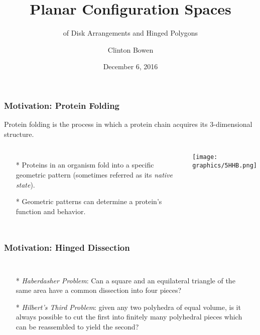 \documentclass{beamer}
\title[Planar Configuration Spaces]{Planar Configuration Spaces }
\subtitle{of Disk Arrangements and Hinged Polygons}
\author{Clinton Bowen}
\institute
{
  Cal State Northridge
}
\date
{December 6, 2016}
\begin{document}
\frame{\titlepage}
\begin{frame}
  \frametitle{Motivation: Protein Folding}
  Protein folding is the process in which a protein chain acquires its 3-dimensional structure.
  \begin{columns}[c] 
   \begin{itemize}
    \item[*] Proteins in an organism fold into a specific geometric pattern (sometimes referred as its \textit{native state}).
    \item[*]  Geometric patterns can determine a protein's function and behavior.
   \end{itemize}
     \begin{minipage}{\linewidth}
        \begin{center}
        \texttt{[image: graphics/5HHB.png]}
        \end{center} 
  \end{minipage}
  \end{columns}
\end{frame}

\begin{frame}\frametitle{Motivation: Hinged Dissection}
    \begin{columns}[c]
        \begin{itemize}
            \item[*] \textit{Haberdasher Problem}: Can a square and an equilateral triangle of the same area have a common dissection into four pieces?
            \item[*]  \textit{Hilbert's Third Problem}: given any two polyhedra of equal volume, is it always possible to cut the first into finitely many polyhedral pieces which can be reassembled to yield the second?  
        \end{itemize}
  \begin{minipage}{\linewidth}
    \begin{center}
    \end{center}
  \end{minipage}
  \end{columns}
\end{frame}
\end{document}
